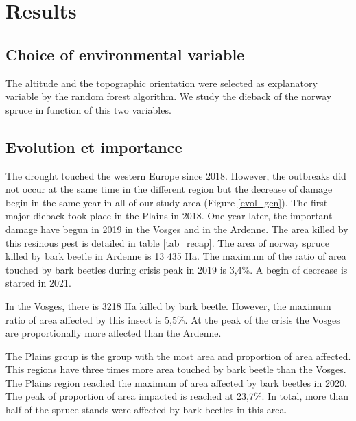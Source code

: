 \documentclass[3p,procedia]{elsarticle}
\begin{document}
	






\section{Results}

\subsection{Choice of environmental variable}
The altitude and the topographic orientation were selected as explanatory variable by the random forest algorithm.
We study the dieback of the norway spruce in function of this two variables.



\subsection{Evolution et importance}

The drought touched the western Europe since 2018.
However, the outbreaks did not occur at the same time in the different region but the decrease of damage begin in the same year in all of our study area (Figure \ref{evol_gen}).
The first major dieback took place in the Plains in 2018.
One year later, the important damage have begun in 2019 in the Vosges and in the Ardenne.  
The area killed by this resinous pest is detailed in table \ref{tab_recap}.
The area of norway spruce killed by bark beetle in Ardenne is 13 435 Ha.
The maximum of the ratio of area touched by bark beetles during crisis peak in 2019 is 3,4\%. 
A begin of decrease is started in 2021.

In the Vosges, there is 3218 Ha killed by bark beetle.
However, the maximum ratio of area affected by this insect is 5,5\%.
At the peak of the crisis the Vosges are proportionally more affected than the Ardenne.

The Plains group is the group with the most area and proportion of area affected.
This regions have three times more area touched by bark beetle than the Vosges.
The Plains region reached the maximum of area affected by bark beetles in 2020. 
The peak of proportion of area impacted is reached at 23,7\%.
In total, more than half of the spruce stands were affected by bark beetles in this area.
\end{document}
